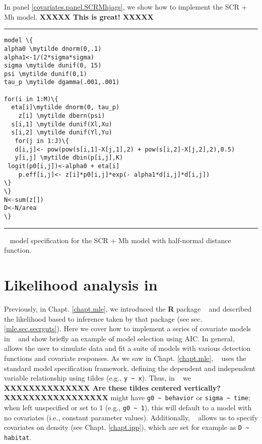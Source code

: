 In panel \ref{covariates.panel.SCRMhjags}, we show how to implement the SCR + Mh model.  
{\bf XXXXX This is great! XXXXX}
\begin{panel}[htp]
\centering
\rule[0.1in]{\textwidth}{.03in}
{\small
\begin{Verbatim}[commandchars=\\\{\}]
model \{
alpha0 \mytilde dnorm(0,.1)
alpha1<-1/(2*sigma*sigma)
sigma \mytilde dunif(0, 15)
psi \mytilde dunif(0,1)
tau_p \mytilde dgamma(.001,.001)

for(i in 1:M)\{
  eta[i]\mytilde dnorm(0, tau_p)
    z[i] \mytilde dbern(psi)
  s[i,1] \mytilde dunif(Xl,Xu)
  s[i,2] \mytilde dunif(Yl,Yu)
   for(j in 1:J)\{
   d[i,j]<- pow(pow(s[i,1]-X[j,1],2) + pow(s[i,2]-X[j,2],2),0.5)
   y[i,j] \mytilde dbin(p[i,j],K)
 logit(p0[i,j])<-alpha0 + eta[i]
    p.eff[i,j]<- z[i]*p0[i,j]*exp(- alpha1*d[i,j]*d[i,j])
\}
\}
N<-sum(z[])
D<-N/area
\}

\end{Verbatim}
}

\rule[-0.1in]{\textwidth}{.03in}
\caption{
\jags~ model specification for the SCR + Mh model with half-normal distance
function.}
\label{covariates.panel.SCRMhjags}
\end{panel}







\section{Likelihood analysis in \secr}
\label{likelihood.secr}

Previously, in Chapt. \ref{chapt.mle}, we introduced the {\bf R}
package \secr~ and described the likelihood based to inference taken
by that package (see sec. \ref{mle.sec.secrguts}).  Here we cover how
to implement a series of covariate models in \secr~ and show briefly
an example of model selection using AIC.  In general, \secr~ allows
the user to simulate data and fit a suite of models with various
detection functions and covariate responses.  As we saw in
Chapt. \ref{chapt.mle}, \secr~ uses the standard \R model
specification framework, defining the dependent and independent
variable relationship using tildes (e.g., \Verb+y ~ x+).  Thus, in
\secr~ we 
{\bf XXXXXXXXXXXXXX Are these tildes centered vertically?
  XXXXXXXXXXXXXXXXX} 
might have \verb+g0 ~ behavior+ or
\verb+sigma ~ time+; when left unspecified or set to 1 (e.g.,
\verb+g0 ~ 1+), this will default to a model with no covariates (i.e.,
constant parameter values).  Additionally, \secr~ allows us to specify
covariates on density (see Chapt. \ref{chapt.ipp}), which are set for
example as \verb+D ~ habitat+.

